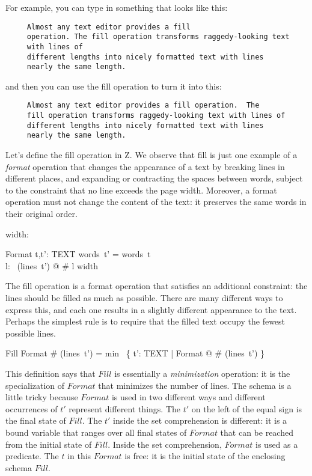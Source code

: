 For example, you can type in something that looks like this:

\begin{verbatim}
     Almost any text editor provides a fill 
     operation. The fill operation transforms raggedy-looking text 
     with lines of
     different lengths into nicely formatted text with lines
     nearly the same length.
\end{verbatim}

and then you can use the fill operation to turn it into this:

\begin{verbatim}
     Almost any text editor provides a fill operation.  The
     fill operation transforms raggedy-looking text with lines of
     different lengths into nicely formatted text with lines
     nearly the same length.
\end{verbatim}

Let's define the fill operation in Z.  We observe that fill is just one
example of a {\em format} operation that changes the appearance of a text by
breaking lines in different places, and expanding or contracting the spaces
between words, subject to the constraint that no line exceeds the page 
width.  Moreover, a format operation must not change the content of the text:
it preserves the same words in their original order.

\begin{axdef} width: \nat \end{axdef}
\begin{schema}{Format}
	t,t': TEXT
\where
	words~t' = words~t \\
	\forall l: \ran~(lines~t') @ \# l \leq width
\end{schema} 
The fill operation is a format operation that satisfies an additional
constraint: the lines should be filled as much as possible.  There are many
different ways to express this, and each one results in a slightly different
appearance to the text.  Perhaps the simplest rule is to require that the
filled text occupy the fewest possible lines.  

\begin{schema}{Fill}
	Format
\where
	\# (lines~t') = min~ \{ t': TEXT | Format @ \# (lines~t') \}
\end{schema}
This definition says that $Fill$ is essentially a {\em minimization}
operation: it is the specialization of $Format$ that minimizes the
number of lines.  The schema is a little tricky because $Format$ is
used in two different ways and different occurrences of $t'$ represent
different things.  The $t'$ on the left of the equal sign is the final
state of $Fill$.  The $t'$ inside the set comprehension is different:
it is a bound variable that ranges over all final states of $Format$
that can be reached from the initial state of $Fill$.  Inside the set
comprehension, $Format$ is used as a predicate.  The $t$ in this
$Format$ is free: it is the initial state of the enclosing schema
$Fill$.

